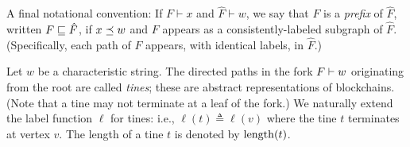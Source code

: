 

A final notational convention: If $F \vdash x$ and
$\hat{F} \vdash w$, we say that $F$ is a \emph{prefix} of $\hat{F}$,
written $F \sqsubseteq \hat{F}$, if 
$x \preceq w$
and $F$ appears as a
consistently-labeled subgraph of $\hat{F}$. 
(Specifically, each path of $F$ appears, with identical labels, in $\hat{F}$.) 





  Let $w$ be a characteristic string.  The directed paths in the fork
  $F \vdash w$ originating from the root are called \emph{tines}; these
  are abstract representations of blockchains. (Note that a tine may 
  not terminate at a leaf of the fork.)  We naturally extend the label
  function $\ell$ for tines: i.e., $\ell(t) \triangleq \ell(v)$ where
  the tine $t$ terminates at vertex $v$. The length of a tine $t$ is
  denoted by $\operatorname{length}(t)$.

